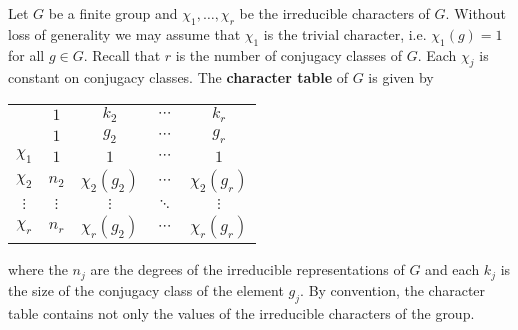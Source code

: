 Let $G$ be a finite group and $\chi_1,\dots,\chi_r$ be the irreducible characters of $G$. Without loss of generality
we may assume that $\chi_1$ is the trivial character, i.e. $\chi_1(g)=1$ for all $g\in G$. 
Recall that $r$ is the number of conjugacy classes of $G$. Each $\chi_j$ is constant on conjugacy classes. 
The \textbf{character table} of 
$G$ is given by 
\begin{center}
\begin{tabular}{|c|cccc|}
\hline 
 & $1$ & $k_{2}$ & $\cdots$ & $k_{r}$\tabularnewline
 & $1$ & $g_{2}$ & $\cdots$ & $g_{r}$\tabularnewline
\hline 
$\chi_{1}$ & $1$ & $1$ & $\cdots$ & $1$\tabularnewline
$\chi_{2}$ & $n_{2}$ & $\chi_{2}(g_{2})$ & $\cdots$ & $\chi_{2}(g_{r})$\tabularnewline
$\vdots$ & $\vdots$ & $\vdots$ & $\ddots$ & $\vdots$\tabularnewline
$\chi_{r}$ & $n_{r}$ & $\chi_{r}(g_{2})$ & $\cdots$ & $\chi_{r}(g_{r})$\tabularnewline
\hline
\end{tabular}
\end{center}
where the $n_j$ are the degrees of the irreducible representations of $G$ and each $k_j$ is 
the size of the conjugacy class of the element $g_j$. By convention, the character table
contains not only the values of the irreducible characters of the group. 

